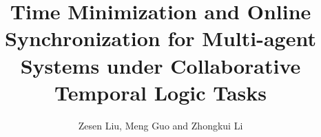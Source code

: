 \documentclass[5p,authoryear]{elsarticle}
\theoremstyle{definition}
\begin{document}
\begin{frontmatter}

\title{Time Minimization and Online Synchronization for Multi-agent Systems under 
	Collaborative Temporal Logic Tasks }


\author{Zesen Liu, Meng Guo and Zhongkui Li}
\address{State Key Laboratory for Turbulence and Complex Systems,Department of Mechanics and Engineering Science,\\
	College of Engineering, Peking University, Beijing 100871, China.}


	
	

\end{frontmatter}
	

	





%
%

%
\end{document}
